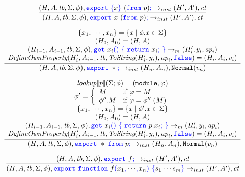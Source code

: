\documentclass[a4paper]{article}
\newcommand{\code}[1]{\textcolor{blue}{\tt #1}}
\newcommand{\module}{{\tt{module}}}
\newcommand{\lookup}{\emph{lookup}}
\newcommand{\If}{\mbox{if}}
\newcommand{\tb}{\emph{tb}}
\newcommand{\ct}{\emph{ct}}
\newcommand{\ap}{\emph{ap}}
\begin{document}
\begin{equation*}
\frac{
    (H, A, \tb, \Sigma, \phi), \code{export}\ \code{\{}x\code{\}}\ (\code{from}\ p)\code{;} \rightarrow_{inst} (H', A'), \ct
}{
    (H, A, \tb, \Sigma, \phi), \code{export}\ x\ (\code{from}\ p)\code{;} \rightarrow_{inst} (H', A'), \ct
}
\end{equation*}

\begin{equation*}
\frac{
    \begin{array}{c}
    \{ x_1, \cdots, x_n \} = \{ x \mid \phi.x \in \Sigma \} \\
    (H_0, A_0) = (H, A) \\
    (H_{i-1}, A_{i-1}, \tb, \Sigma, \phi), \code{get}\ x_i\code{()}\ \code{\{}\ \code{return}\ x_i\code{;}\ \code{\}} \rightarrow_m (H'_i, y_i, \ap_i) \\
    \emph{DefineOwnProperty}(H'_i, A_{i-1}, \tb, \emph{ToString}(H'_i, y_i), \ap_i, \code{false}) = (H_i, A_i, v_i)
    \end{array}
}{
    (H, A, \tb, \Sigma, \phi), \code{export}\ *\code{;} \rightarrow_{inst} (H_n, A_n), \texttt{Normal}(v_n)
}
\end{equation*}

\begin{equation*}
\frac{
    \begin{array}{c}
    \lookup \llbracket p \rrbracket (\Sigma; \phi) = (\module, \varphi) \\
    \phi' = \left\{\begin{array}{ll}
    M & \If\ \varphi = M \\
    \phi''.M & \If\ \varphi = \phi''.(M)
    \end{array}\right. \\
    \{ x_1, \cdots, x_n \} = \{ x \mid \phi'.x \in \Sigma \} \\
    (H_0, A_0) = (H, A) \\
    (H_{i-1}, A_{i-1}, \tb, \Sigma, \phi), \code{get}\ x_i\code{()}\ \code{\{}\ \code{return}\ p\code{.}x_i\code{;}\ \code{\}} \rightarrow_m (H'_i, y_i, \ap_i) \\
    \emph{DefineOwnProperty}(H'_i, A_{i-1}, \tb, \emph{ToString}(H'_i, y_i), \ap_i, \code{false}) = (H_i, A_i, v_i)
    \end{array}
}{
    (H, A, \tb, \Sigma, \phi), \code{export}\ *\ \code{from}\ p\code{;} \rightarrow_{inst} (H_n, A_n), \texttt{Normal}(v_n)
}
\end{equation*}

\begin{equation*}
\frac{
    (H, A, \tb, \Sigma, \phi), \code{export}\ f\code{;} \rightarrow_{inst} (H', A'), \ct
}{
    (H, A, \tb, \Sigma, \phi), \code{export}\ \code{function}\ f\code{(}x_1\code{,} \cdots\code{,}x_n\code{)}\ \code{\{} s_1 \cdots s_m \code{\}} \rightarrow_{inst} (H', A'), \ct
}
\end{equation*}
\end{document}

